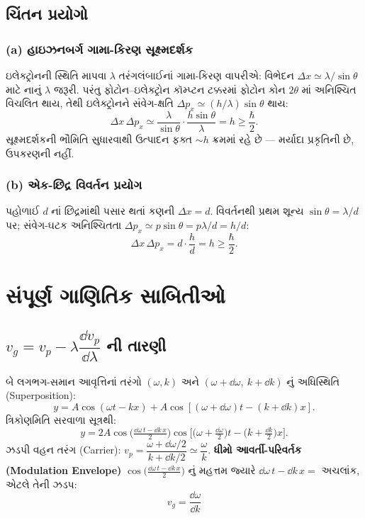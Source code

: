 \subsection{ચિંતન પ્રયોગો }
\subsubsection*{(a) હાઇઝનબર્ગ ગામા-કિરણ સૂક્ષ્મદર્શક}
ઇલેક્ટ્રોનની સ્થિતિ માપવા $\lambda$ તરંગલંબાઈનાં ગામા-કિરણ વાપરીએ: વિભેદન $\Delta x\simeq\lambda/\sin\theta$ માટે નાનું $\lambda$ જરૂરી. પરંતુ ફોટોન–ઇલેક્ટ્રોન કૉમ્પ્ટન ટક્કરમાં ફોટોન કોન $2\theta$ માં અનિશ્ચિત વિચલિત થાય, તેથી ઇલેક્ટ્રોનને સંવેગ-ક્ષતિ $\Delta p_x\simeq(h/\lambda)\sin\theta$ થાય:
\[
\Delta x\,\Delta p_x\simeq\frac{\lambda}{\sin\theta}\cdot\frac{h\sin\theta}{\lambda}=h\ge\frac{\hbar}{2}.
\]
સૂક્ષ્મદર્શકની ભૌમિતિ સુધારવાથી ઉત્પાદન ફક્ત $\sim h$ ક્રમમાં રહે છે — મર્યાદા પ્રકૃતિની છે, ઉપકરણની નહીં.

\subsubsection*{(b) એક-છિદ્ર વિવર્તન પ્રયોગ}
પહોળાઈ $d$ નાં છિદ્રમાંથી પસાર થતાં કણની $\Delta x=d$. વિવર્તનથી પ્રથમ શૂન્ય $\sin\theta=\lambda/d$ પર; સંવેગ-ઘટક અનિશ્ચિતતા $\Delta p_x\simeq p\sin\theta=p\lambda/d=h/d$:
\[
\Delta x\,\Delta p_x=d\cdot\frac{h}{d}=h\ge\frac{\hbar}{2}.
\]

\section{સંપૂર્ણ ગાણિતિક સાબિતીઓ}

\subsection{$v_g=v_p-\lambda\dfrac{\dd v_p}{\dd\lambda}$ ની તારણી}
\label{sec:vgderivation}
બે લગભગ-સમાન આવૃત્તિનાં તરંગો $(\omega,k)$ અને $(\omega+\dd\omega,\ k+\dd k)$ નું અધિસ્થિતિ (Superposition):
\[
y=A\cos(\omega t-kx)+A\cos[(\omega+\dd\omega)t-(k+\dd k)x].
\]
ત્રિકોણમિતિ સરવાળા સૂત્રથી:
\begin{equation}
y=2A\cos\!\Big(\tfrac{\dd\omega\,t-\dd k\,x}{2}\Big)\cos\!\Big[\big(\omega+\tfrac{\dd\omega}{2}\big)t-\big(k+\tfrac{\dd k}{2}\big)x\Big].
\label{eq:beat}
\end{equation}
ઝડપી વહન તરંગ (Carrier): $v_p=\dfrac{\omega+\dd\omega/2}{k+\dd k/2}\simeq\dfrac{\omega}{k}$.
\textbf{ધીમો આવર્તી-પરિવર્તક (Modulation Envelope)} $\cos\big(\frac{\dd\omega\,t-\dd k\,x}{2}\big)$ નું મહત્તમ જ્યારે $\dd\omega\,t-\dd k\,x=$ અચલાંક, એટલે તેની ઝડપ:
\begin{equation}
\boxed{\;v_g=\frac{\dd\omega}{\dd k}\;}
\end{equation}

